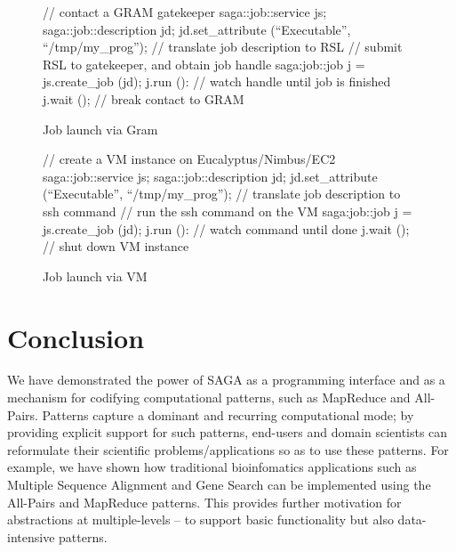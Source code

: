 \documentclass[conference,final]{IEEEtran}
\begin{document}
\begin{figure}[!ht]
 \begin{center}
  \begin{mycode}[label=SAGA Job Launch via GRAM gatekeeper]
   { // contact a GRAM gatekeeper
    saga::job::service     js;
    saga::job::description jd;
    jd.set_attribute (``Executable'', ``/tmp/my_prog'');
    // translate job description to RSL
    // submit RSL to gatekeeper, and obtain job handle
    saga:job::job j = js.create_job (jd);
    j.run ():
    // watch handle until job is finished
    j.wait ();
   } // break contact to GRAM
  \end{mycode}
  \caption{\label{gramjob}Job launch via Gram }
 \end{center}
\end{figure}


\begin{figure}[!ht]
 \begin{center}
  \begin{mycode}[label=SAGA create a VM instance on a Cloud]
   {// create a VM instance on Eucalyptus/Nimbus/EC2
    saga::job::service     js;
    saga::job::description jd;
    jd.set_attribute (``Executable'', ``/tmp/my_prog'');
    // translate job description to ssh command
    // run the ssh command on the VM
    saga:job::job j = js.create_job (jd);
    j.run ():
    // watch command until done
    j.wait ();
   } // shut down VM instance
  \end{mycode}
  \caption{\label{vmjob} Job launch via VM}
 \end{center}
\end{figure}


\section{Conclusion}
We have demonstrated the power of SAGA as a programming interface and
as a mechanism for codifying computational patterns, such as MapReduce
and All-Pairs.  Patterns capture a dominant and recurring
computational mode; by providing explicit support for such patterns,
end-users and domain scientists can reformulate their scientific
problems/applications so as to use these patterns. For example, we
have shown how traditional bioinfomatics applications such as Multiple
Sequence Alignment and Gene Search can be implemented using the
All-Pairs and MapReduce patterns. This provides further motivation for
abstractions at multiple-levels -- to support basic functionality but
also data-intensive patterns.
\end{document}
